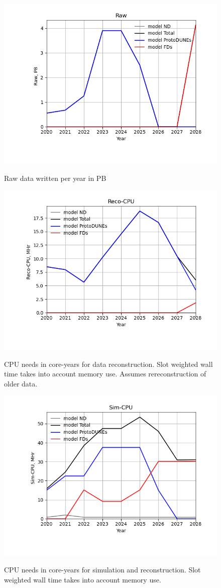 \documentclass[12pt,landscape]{article}
\begin{document}
\begin{figure}[ht]
\centering\includegraphics[height=0.4\textwidth]{report/Parameters_2022-11-07-2028-Raw.png}\label{Raw}
\caption{Raw data written per year in PB}
\end{figure}
\begin{figure}[ht]
\centering\includegraphics[height=0.4\textwidth]{report/Parameters_2022-11-07-2028-Reco-CPU.png}\label{Reco-CPU}
\caption{CPU needs in core-years for data reconstruction.              Slot weighted wall time takes into account memory use.  Assumes rereconstruction of older data.}
\end{figure}
\begin{figure}[ht]
\centering\includegraphics[height=0.4\textwidth]{report/Parameters_2022-11-07-2028-Sim-CPU.png}\label{Sim-CPU}
\caption{CPU needs in core-years for simulation and reconstruction.              Slot weighted wall time takes into account memory use.}
\end{figure}
\end{document}
